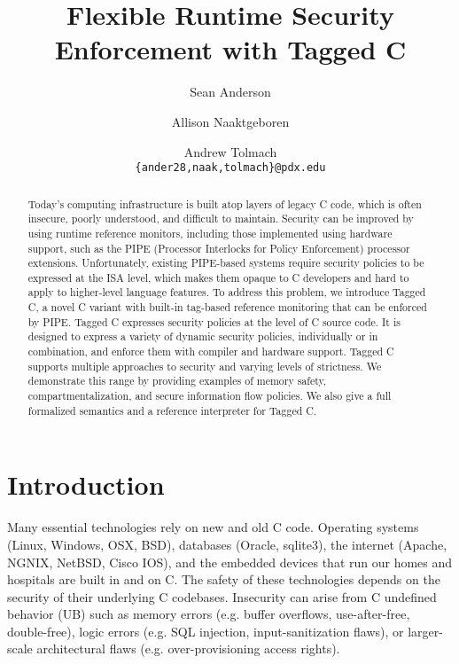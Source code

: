 \documentclass{llncs}
\title{Flexible Runtime Security Enforcement with Tagged C}
\author{Sean Anderson \and Allison Naaktgeboren \and Andrew Tolmach\\
{\tt\{ander28,naak,tolmach\}@pdx.edu}}
\institute{Portland State University\\
Portland, OR, USA}
\begin{document}





\maketitle

\begin{abstract}
Today's computing infrastructure is built atop layers of legacy C code, 
which is often insecure, poorly understood, and difficult to maintain.
Security can be improved by using runtime reference monitors, including those
implemented using hardware support, such as the PIPE (Processor
Interlocks for Policy Enforcement) processor extensions. Unfortunately,
existing PIPE-based systems require security policies to be expressed at the ISA level,
which makes them opaque to C developers and hard to apply to higher-level language features.
To address this problem, we introduce Tagged C, a novel C variant with
built-in tag-based reference monitoring that can be enforced by PIPE.
Tagged C expresses security policies at the level of C source code.
It is designed to express a variety of dynamic security policies,  
individually or in combination, and enforce them with compiler and hardware support.
Tagged C supports multiple approaches to security and varying levels of strictness. We demonstrate
this range by providing examples of memory safety, compartmentalization,
and secure information flow policies. We also give a full formalized semantics
and a reference interpreter for Tagged C.
\end{abstract}


\section{Introduction}
Many essential technologies rely on new and old C code.
Operating systems (Linux, Windows, OSX, BSD), databases (Oracle, sqlite3), the internet
(Apache, NGNIX, NetBSD, Cisco IOS), and the 
embedded devices that run our homes and hospitals are built in and on C. %
The safety of these technologies
depends on the security of their underlying C codebases.
Insecurity can arise from C
undefined behavior (UB) such as memory errors (e.g. buffer overflows, use-after-free, double-free),
logic errors (e.g. SQL injection, input-sanitization flaws), or
larger-scale architectural flaws (e.g. over-provisioning access rights).
\end{document}
